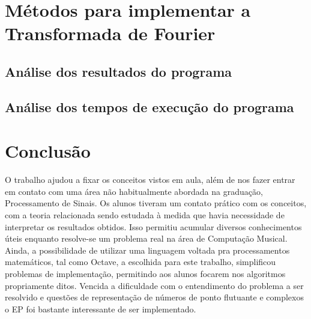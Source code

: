 \documentclass[brazil,times]{abnt}
\begin{document}
\section*{Métodos para implementar a Transformada de Fourier}

\subsection*{Análise dos resultados do programa}

\subsection*{Análise dos tempos de execução do programa}



\section*{Conclusão}
	O trabalho ajudou a fixar os conceitos vistos em aula, além de nos fazer entrar em contato com uma área não habitualmente abordada na graduação, Processamento de Sinais. Os alunos tiveram um contato prático com os conceitos, com a teoria relacionada sendo estudada à medida que havia necessidade de interpretar os resultados obtidos. Isso permitiu acumular diversos conhecimentos úteis enquanto resolve-se um problema real na área de Computação Musical. Ainda, a possibilidade de utilizar uma linguagem voltada pra processamentos matemáticos, tal como Octave, a escolhida para este trabalho, simplificou problemas de implementação, permitindo aos alunos focarem nos algoritmos propriamente ditos. Vencida a dificuldade com o entendimento do problema a ser resolvido e questões de representação de números de ponto flutuante e complexos o EP foi bastante interessante de ser implementado.
	
%
%
\end{document}

